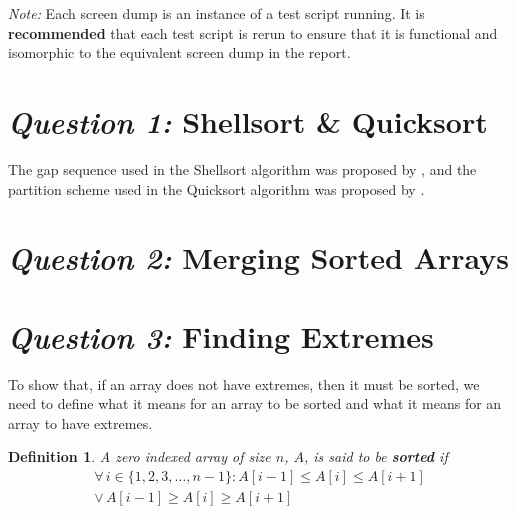 \documentclass[12pt]{article}
\newtheorem*{definition}{Definition}
\begin{document}
\textit{Note:} Each screen dump is an instance of a test script
running. It is \textbf{recommended} that each test script is
rerun to ensure that it is functional and isomorphic to the
equivalent screen dump in the report.

\section{\textit{Question 1:} Shellsort \& Quicksort}

The gap sequence used in the Shellsort algorithm was proposed by
\textcite{frank60}, and the partition scheme used in the
Quicksort algorithm was proposed by \textcite{hoare62}.







\section{\textit{Question 2:} Merging Sorted Arrays}







\section{\textit{Question 3:} Finding Extremes}

To show that, if an array does not have extremes, then it must
be sorted, we need to define what it means for an array to be
sorted and what it means for an array to have extremes.

\begin{definition}
  A zero indexed array of size $n$, $A$, is said to be
  \textbf{sorted} if
  \begin{align*}
    \forall \, i \in \{1,2,3,\ldots,n-1\} :
    A[i-1] \leq A[i] \leq A[i+1] \\
    \vee \,
    A[i-1] \geq A[i] \geq A[i+1]
  \end{align*}
\end{definition}
\end{document}
